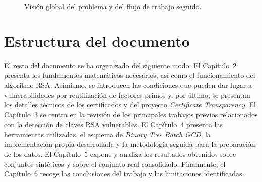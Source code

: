 \begin{figure}[H]
    \centering
    \caption{Visión global del problema y del flujo de trabajo seguido.}
    \label{fig:vision_global_tfm}
\end{figure}

\section{Estructura del documento}

El resto del documento se ha organizado del siguiente modo. El Capítulo~2 presenta los fundamentos matemáticos necesarios, así como el funcionamiento del algoritmo RSA. Asimismo, se introducen las condiciones que pueden dar lugar a vulnerabilidades por reutilización de factores primos y, por último, se presentan los detalles técnicos de los certificados y del proyecto \textit{Certificate Transparency}. El Capítulo~3 se centra en la revisión de los principales trabajos previos relacionados con la detección de claves RSA vulnerables. El Capítulo~4 presenta las herramientas utilizadas, el esquema de \textit{Binary Tree Batch GCD}, la implementación propia desarrollada y la metodología seguida para la preparación de los datos. El Capítulo~5 expone y analiza los resultados obtenidos sobre conjuntos sintéticos y sobre el conjunto real consolidado. Finalmente, el Capítulo~6 recoge las conclusiones del trabajo y las limitaciones identificadas.
